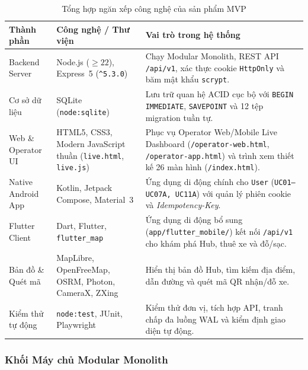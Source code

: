 \begin{table}[H]
\centering
\caption{Tổng hợp ngăn xếp công nghệ của sản phẩm MVP}
\label{tab:tech-stack}
\begin{tabularx}{\textwidth}{>{\raggedright\arraybackslash}p{3.4cm} >{\raggedright\arraybackslash}p{4.8cm} >{\raggedright\arraybackslash}X}
\toprule
\textbf{Thành phần} & \textbf{Công nghệ / Thư viện} & \textbf{Vai trò trong hệ thống} \\
\midrule
Backend Server & Node.js ($\ge 22$), Express~5 (\texttt{\textasciicircum 5.3.0}) & Chạy Modular Monolith, REST API \texttt{/api/v1}, xác thực cookie \texttt{HttpOnly} và băm mật khẩu \texttt{scrypt}. \\
Cơ sở dữ liệu & SQLite (\texttt{node:sqlite}) & Lưu trữ quan hệ ACID cục bộ với \texttt{BEGIN IMMEDIATE}, \texttt{SAVEPOINT} và 12 tệp migration tuần tự. \\
Web \& Operator UI & HTML5, CSS3, Modern JavaScript thuần (\texttt{live.html}, \texttt{live.js}) & Phục vụ Operator Web/Mobile Live Dashboard (\texttt{/operator-web.html}, \texttt{/operator-app.html}) và trình xem thiết kế 26 màn hình (\texttt{/index.html}). \\
Native Android App & Kotlin, Jetpack Compose, Material~3 & Ứng dụng di động chính cho \texttt{User} (\texttt{UC01--UC07A, UC11A}) với quản lý phiên cookie và \textit{Idempotency-Key}. \\
Flutter Client & Dart, Flutter, \texttt{flutter\_map} & Ứng dụng di động bổ sung (\texttt{app/flutter\_mobile/}) kết nối \texttt{/api/v1} cho khám phá Hub, thuê xe và đỗ/sạc. \\
Bản đồ \& Quét mã & MapLibre, OpenFreeMap, OSRM, Photon, CameraX, ZXing & Hiển thị bản đồ Hub, tìm kiếm địa điểm, dẫn đường và quét mã QR nhận/đỗ xe. \\
Kiểm thử tự động & \texttt{node:test}, JUnit, Playwright & Kiểm thử đơn vị, tích hợp API, tranh chấp đa luồng WAL và kiểm định giao diện tự động. \\
\bottomrule
\end{tabularx}
\end{table}

\subsubsection*{Khối Máy chủ Modular Monolith}

